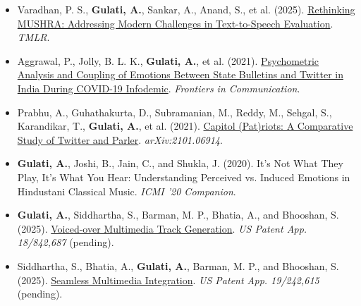 \documentclass[11pt]{article}
\begin{document}
{\small
\begin{itemize}
  \item Varadhan, P. S., \textbf{Gulati, A.}, Sankar, A., Anand, S., et al. (2025). \href{https://arxiv.org/abs/2411.12719}{Rethinking MUSHRA: Addressing Modern Challenges in Text-to-Speech Evaluation}. \textit{TMLR}.
  \item Aggrawal, P., Jolly, B. L. K., \textbf{Gulati, A.}, et al. (2021). \href{https://www.frontiersin.org/journals/communication/articles/10.3389/fcomm.2021.695913/full}{Psychometric Analysis and Coupling of Emotions Between State Bulletins and Twitter in India During COVID-19 Infodemic}. \textit{Frontiers in Communication}.
  \item Prabhu, A., Guhathakurta, D., Subramanian, M., Reddy, M., Sehgal, S., Karandikar, T., \textbf{Gulati, A.}, et al. (2021). \href{https://arxiv.org/abs/2101.06914}{Capitol (Pat)riots: A Comparative Study of Twitter and Parler}. \textit{arXiv:2101.06914}.
  \item \textbf{Gulati, A.}, Joshi, B., Jain, C., and Shukla, J. (2020). It's Not What They Play, It's What You Hear: Understanding Perceived vs. Induced Emotions in Hindustani Classical Music. \textit{ICMI '20 Companion}.
  \item \textbf{Gulati, A.}, Siddhartha, S., Barman, M. P., Bhatia, A., and Bhooshan, S. (2025). \href{https://patents.google.com/patent/US20250210065A1/en}{Voiced-over Multimedia Track Generation}. \textit{US Patent App. 18/842,687} (pending).
  \item Siddhartha, S., Bhatia, A., \textbf{Gulati, A.}, Barman, M. P., and Bhooshan, S. (2025). \href{https://patents.google.com/patent/US20250317628A1/en}{Seamless Multimedia Integration}. \textit{US Patent App. 19/242,615} (pending).
\end{itemize}
}
\end{document}

